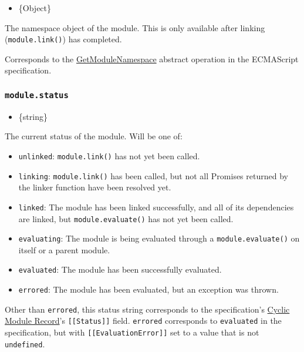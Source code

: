 \begin{itemize}
\tightlist
\item
  \{Object\}
\end{itemize}

The namespace object of the module. This is only available after linking
(\texttt{module.link()}) has completed.

Corresponds to the
\href{https://tc39.es/ecma262/\#sec-getmodulenamespace}{GetModuleNamespace}
abstract operation in the ECMAScript specification.

\subsubsection{\texorpdfstring{\texttt{module.status}}{module.status}}\label{module.status}

\begin{itemize}
\tightlist
\item
  \{string\}
\end{itemize}

The current status of the module. Will be one of:

\begin{itemize}
\item
  \texttt{\textquotesingle{}unlinked\textquotesingle{}}:
  \texttt{module.link()} has not yet been called.
\item
  \texttt{\textquotesingle{}linking\textquotesingle{}}:
  \texttt{module.link()} has been called, but not all Promises returned
  by the linker function have been resolved yet.
\item
  \texttt{\textquotesingle{}linked\textquotesingle{}}: The module has
  been linked successfully, and all of its dependencies are linked, but
  \texttt{module.evaluate()} has not yet been called.
\item
  \texttt{\textquotesingle{}evaluating\textquotesingle{}}: The module is
  being evaluated through a \texttt{module.evaluate()} on itself or a
  parent module.
\item
  \texttt{\textquotesingle{}evaluated\textquotesingle{}}: The module has
  been successfully evaluated.
\item
  \texttt{\textquotesingle{}errored\textquotesingle{}}: The module has
  been evaluated, but an exception was thrown.
\end{itemize}

Other than \texttt{\textquotesingle{}errored\textquotesingle{}}, this
status string corresponds to the specification's
\href{https://tc39.es/ecma262/\#sec-cyclic-module-records}{Cyclic Module
Record}'s \texttt{{[}{[}Status{]}{]}} field.
\texttt{\textquotesingle{}errored\textquotesingle{}} corresponds to
\texttt{\textquotesingle{}evaluated\textquotesingle{}} in the
specification, but with \texttt{{[}{[}EvaluationError{]}{]}} set to a
value that is not \texttt{undefined}.

